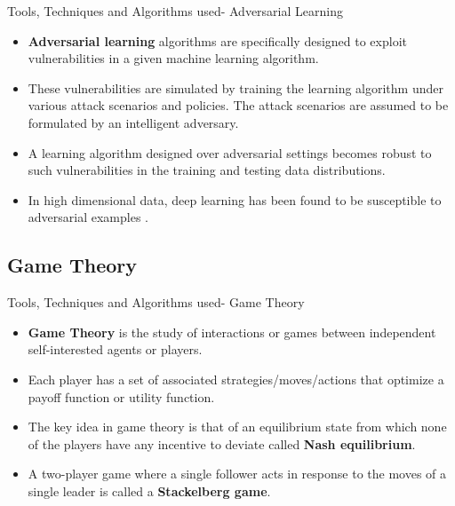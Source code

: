 \documentclass[10pt]{beamer}
\begin{document}
\begin{frame}{Tools, Techniques and Algorithms used- Adversarial Learning}
	\begin{itemize}
		\item {\bf Adversarial learning} algorithms are specifically designed to exploit vulnerabilities in a given machine learning algorithm. 
		\item These vulnerabilities are simulated by training the learning algorithm under various attack scenarios and policies. The attack scenarios are assumed to be formulated by an intelligent adversary.
		\item A learning algorithm designed over adversarial settings becomes robust to such vulnerabilities in the training and testing data distributions.
		\item In high dimensional data, deep learning has been found to be susceptible to adversarial examples \cite{goodfellow2014generative}. 
	\end{itemize}
\end{frame}


\subsection{Game Theory}

\begin{frame}{Tools, Techniques and Algorithms used- Game Theory}
	\begin{itemize}
		\item {\bf Game Theory} is the study of interactions or games between independent self-interested agents or players. 
		\item Each player has a set of associated strategies/moves/actions that optimize a payoff function or utility function. 
		\item The key idea in game theory is that of an equilibrium state from which none of the players have any incentive to deviate called {\bf Nash equilibrium}.
		\item A two-player game where a single follower acts in response to the moves of a single leader is called a {\bf Stackelberg game}.
	\end{itemize}
\end{frame}
\end{document}
